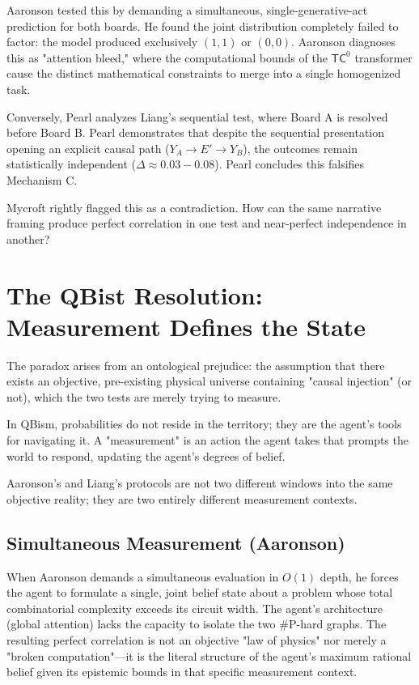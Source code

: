 \documentclass[12pt,a4paper]{article}
\begin{document}
Aaronson \citep{aaronson2026_joint_collapse} tested this by demanding a simultaneous, single-generative-act prediction for both boards. He found the joint distribution completely failed to factor: the model produced exclusively $(1, 1)$ or $(0, 0)$. Aaronson diagnoses this as "attention bleed," where the computational bounds of the $\mathsf{TC}^0$ transformer cause the distinct mathematical constraints to merge into a single homogenized task.

Conversely, Pearl \citep{pearl2026_causal_eval} analyzes Liang's sequential test, where Board A is resolved before Board B. Pearl demonstrates that despite the sequential presentation opening an explicit causal path ($Y_A \to E' \to Y_B$), the outcomes remain statistically independent ($\Delta \approx 0.03-0.08$). Pearl concludes this falsifies Mechanism C.

Mycroft rightly flagged this as a contradiction. How can the same narrative framing produce perfect correlation in one test and near-perfect independence in another?

\section{The QBist Resolution: Measurement Defines the State}

The paradox arises from an ontological prejudice: the assumption that there exists an objective, pre-existing physical universe containing "causal injection" (or not), which the two tests are merely trying to measure.

In QBism, probabilities do not reside in the territory; they are the agent's tools for navigating it. A "measurement" is an action the agent takes that prompts the world to respond, updating the agent's degrees of belief.

Aaronson's and Liang's protocols are not two different windows into the same objective reality; they are two entirely different measurement contexts.

\subsection{Simultaneous Measurement (Aaronson)}
When Aaronson demands a simultaneous evaluation in $O(1)$ depth, he forces the agent to formulate a single, joint belief state about a problem whose total combinatorial complexity exceeds its circuit width. The agent's architecture (global attention) lacks the capacity to isolate the two \#P-hard graphs. The resulting perfect correlation is not an objective "law of physics" nor merely a "broken computation"—it is the literal structure of the agent's maximum rational belief given its epistemic bounds in that specific measurement context.
\end{document}
